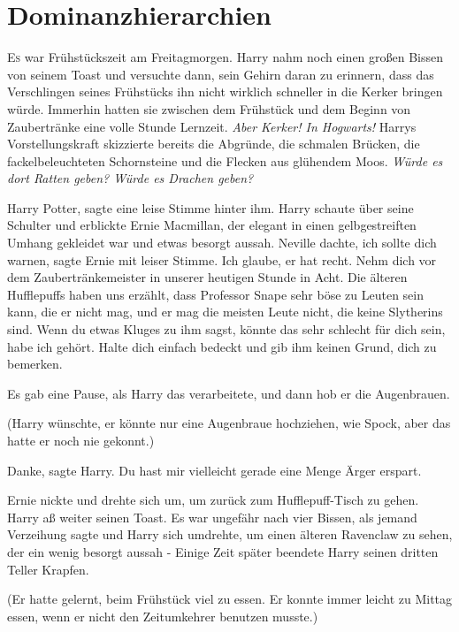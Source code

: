 \chapter{Dominanzhierarchien}

\lettrine{E}{s} war Frühstückszeit am Freitagmorgen. Harry nahm noch einen
großen Bissen von seinem Toast und versuchte dann, sein Gehirn daran zu
erinnern, dass das Verschlingen seines Frühstücks ihn nicht wirklich schneller
in die Kerker bringen würde. Immerhin hatten sie zwischen dem Frühstück und dem
Beginn von Zaubertränke eine volle Stunde Lernzeit. \emph{Aber Kerker! In
Hogwarts! } Harrys Vorstellungskraft skizzierte bereits die Abgründe, die
schmalen Brücken, die fackelbeleuchteten Schornsteine und die Flecken aus
glühendem Moos. \emph{Würde es dort Ratten geben? Würde es Drachen geben?}

\glqq Harry Potter\grqq{}, sagte eine leise Stimme hinter ihm. Harry schaute
über seine Schulter und erblickte Ernie Macmillan, der elegant in einen
gelbgestreiften Umhang gekleidet war und etwas besorgt aussah. \glqq Neville
dachte, ich sollte dich warnen\grqq{}, sagte Ernie mit leiser Stimme. \glqq Ich
glaube, er hat recht. Nehm dich vor dem Zaubertränkemeister in unserer heutigen
Stunde in Acht. Die älteren Hufflepuffs haben uns erzählt, dass Professor Snape
sehr böse zu Leuten sein kann, die er nicht mag, und er mag die meisten Leute
nicht, die keine Slytherins sind. Wenn du etwas Kluges zu ihm sagst, könnte das
sehr schlecht für dich sein, habe ich gehört. Halte dich einfach bedeckt und gib
ihm keinen Grund, dich zu bemerken.\grqq{}

Es gab eine Pause, als Harry das verarbeitete, und dann hob er die Augenbrauen.

(Harry wünschte, er könnte nur eine Augenbraue hochziehen, wie Spock, aber das
hatte er noch nie gekonnt.)

\glqq Danke\grqq{}, sagte Harry. \glqq Du hast mir vielleicht gerade eine Menge
Ärger erspart.\grqq{}

Ernie nickte und drehte sich um, um zurück zum Hufflepuff-Tisch zu gehen. Harry
aß weiter seinen Toast. Es war ungefähr nach vier Bissen, als jemand \glqq
Verzeihung\grqq{} sagte und Harry sich umdrehte, um einen älteren Ravenclaw zu
sehen, der ein wenig besorgt aussah - Einige Zeit später beendete Harry seinen
dritten Teller Krapfen.

(Er hatte gelernt, beim Frühstück viel zu essen. Er konnte immer leicht zu
Mittag essen, wenn er nicht den Zeitumkehrer benutzen musste.)

